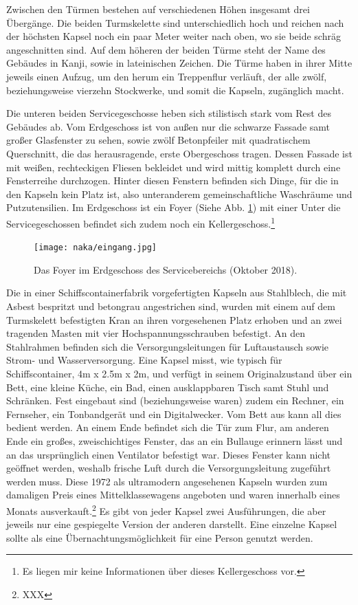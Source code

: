 \documentclass[a4paper, 12pt]{article}
\begin{document}
\begin{onehalfspace}
Zwischen den Türmen bestehen auf verschiedenen Höhen insgesamt drei Übergänge. Die beiden Turmskelette sind unterschiedlich hoch und reichen nach der höchsten Kapsel noch ein paar Meter weiter nach oben, wo sie beide schräg angeschnitten sind. Auf dem höheren der beiden Türme steht der Name des Gebäudes in Kanji, sowie in lateinischen Zeichen. Die Türme haben in ihrer Mitte jeweils einen Aufzug, um den herum ein Treppenflur verläuft, der alle zwölf, beziehungsweise vierzehn Stockwerke, und somit die Kapseln, zugänglich macht.

Die unteren beiden Servicegeschosse heben sich stilistisch stark vom Rest des Gebäudes ab. Vom Erdgeschoss ist von außen nur die schwarze Fassade samt großer Glasfenster zu sehen, sowie zwölf Betonpfeiler mit quadratischem Querschnitt, die das herausragende, erste Obergeschoss tragen. Dessen Fassade ist mit weißen, rechteckigen Fliesen bekleidet und wird mittig komplett durch eine Fensterreihe durchzogen. Hinter diesen Fenstern befinden sich Dinge, für die in den Kapseln kein Platz ist, also unteranderem gemeinschaftliche Waschräume und Putzutensilien. Im Erdgeschoss ist ein Foyer (Siehe Abb. \ref{fig:eingang}) mit einer  Unter die Servicegeschossen befindet sich zudem noch ein Kellergeschoss.\footnote{Es liegen mir keine Informationen über dieses Kellergeschoss vor.}

\begin{figure}[h]
    \centering
    \texttt{[image: naka/eingang.jpg]}
    \caption{Das Foyer im Erdgeschoss des Servicebereichs (Oktober 2018).}
    \label{fig:eingang}
\end{figure}

Die in einer Schiffscontainerfabrik vorgefertigten Kapseln aus Stahlblech, die mit Asbest bespritzt und betongrau angestrichen sind, wurden mit einem auf dem Turmskelett befestigten Kran an ihren vorgesehenen Platz erhoben und an zwei tragenden Masten mit vier Hochspannungsschrauben befestigt. An den Stahlrahmen befinden sich die Versorgungsleitungen für Luftaustausch sowie Strom- und Wasserversorgung. Eine Kapsel misst, wie typisch für Schiffscontainer, 4m x 2.5m x 2m, und verfügt in seinem Originalzustand über ein Bett, eine kleine Küche, ein Bad, einen ausklappbaren Tisch samt Stuhl und Schränken. Fest eingebaut sind (beziehungsweise waren) zudem ein Rechner, ein Fernseher, ein Tonbandgerät und ein Digitalwecker. Vom Bett aus kann all dies bedient werden. An einem Ende befindet sich die Tür zum Flur, am anderen Ende ein großes, zweischichtiges Fenster, das an ein Bullauge erinnern lässt und an das ursprünglich einen Ventilator befestigt war. Dieses Fenster kann nicht geöffnet werden, weshalb frische Luft durch die Versorgungsleitung zugeführt werden muss. Diese 1972 als ultramodern angesehenen Kapseln wurden zum damaligen Preis eines Mittelklassewagens angeboten und waren innerhalb eines Monats ausverkauft.\footnote{XXX} Es gibt von jeder Kapsel zwei Ausführungen, die aber jeweils nur eine gespiegelte Version der anderen darstellt. Eine einzelne Kapsel sollte als eine Übernachtungsmöglichkeit für eine Person genutzt werden. 


\end{onehalfspace}
\end{document}
